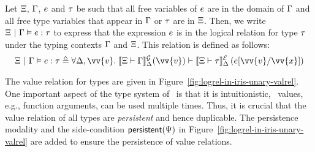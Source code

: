 Let $\Xi$, $\Gamma$, $e$ and $\tau$ be such that all free
variables of $e$ are in the domain of $\Gamma$ and all free type
variables that appear in $\Gamma$ or $\tau$ are in $\Xi$. Then, we
write $\Xi ~|~ \Gamma \vDash e : \tau$ to express that the
expression $e$ is in the logical relation for type $\tau$ under
the typing contexts $\Gamma$ and $\Xi$. This relation is defined as
follows:
\[
  \semtyped{\Tenv}{\env}{\expr}{\typ} \eqdef{} \forall \semenv,
  \vv{\val}.\; \semGtype{\Tenv}{\env}{\semenv}(\vv{\val}) \proves
  \semEtype{\Tenv}{\typ}{\semenv}\left(\subst{\expr}{\vv{\var}}{\vv{\val}}\right)
\]

The value relation for types are given in
Figure~\ref{fig:logrel-in-iris-unary-valrel}. One important aspect of
the type system of \TheLang\, is that it is intuitionistic, \ie\
values, e.g., function arguments, can be used multiple times. Thus, it
is crucial that the value relation of all types are \emph{persistent}
and hence duplicable. The persistence modality and the side-condition
$\textsf{\upshape persistent}(\Psi)$ in Figure~\ref{fig:logrel-in-iris-unary-valrel}
are added to ensure the persistence of value relations.

